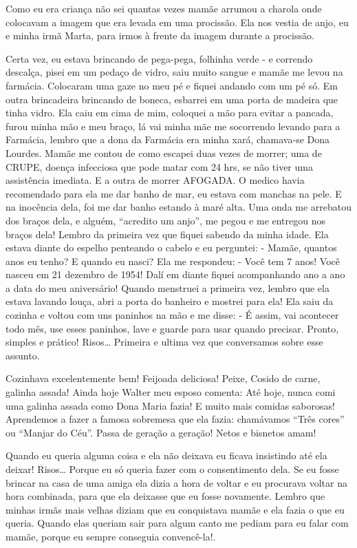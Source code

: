 \documentclass[
  brazil,
  a6paper,
  oneside,
  landscape,
  14pt]{scrbook}
\begin{document}
Como eu era criança não sei quantas vezes mamãe arrumou a charola onde
colocavam a imagem que era levada em uma procissão. Ela nos vestia de
anjo, eu e minha irmã Marta, para irmos à frente da imagem durante a
procissão.

Certa vez, eu estava brincando de pega-pega, folhinha verde - e correndo
descalça, pisei em um pedaço de vidro, saiu muito sangue e mamãe me
levou na farmácia. Colocaram uma gaze no meu pé e fiquei andando com um
pé só. Em outra brincadeira brincando de boneca, esbarrei em uma porta
de madeira que tinha vidro. Ela caiu em cima de mim, coloquei a mão para
evitar a pancada, furou minha mão e meu braço, lá vai minha mãe me
socorrendo levando para a Farmácia, lembro que a dona da Farmácia era
minha xará, chamava-se Dona Lourdes. Mamãe me contou de como escapei
duas vezes de morrer; uma de CRUPE, doença infecciosa que pode matar com
24 hrs, se não tiver uma assistência imediata. E a outra de morrer
AFOGADA. O medico havia recomendado para ela me dar banho de mar, eu
estava com manchas na pele. E na inocência dela, foi me dar banho
estando à maré alta. Uma onda me arrebatou dos braços dela, e alguém,
``acredito um anjo'', me pegou e me entregou nos braços dela! Lembro da
primeira vez que fiquei sabendo da minha idade. Ela estava diante do
espelho penteando o cabelo e eu perguntei: - Mamãe, quantos anos eu
tenho? E quando eu nasci? Ela me respondeu: - Você tem 7 anos! Você
nasceu em 21 dezembro de 1954! Dalí em diante fiquei acompanhando ano a
ano a data do meu aniversário! Quando menstruei a primeira vez, lembro
que ela estava lavando louça, abri a porta do banheiro e mostrei para
ela! Ela saiu da cozinha e voltou com uns paninhos na mão e me disse: -
É assim, vai acontecer todo mês, use esses paninhos, lave e guarde para
usar quando precisar. Pronto, simples e prático! Risos\ldots{} Primeira
e ultima vez que conversamos sobre esse assunto.

Cozinhava excelentemente bem! Feijoada deliciosa! Peixe, Cosido de
carne, galinha assada! Ainda hoje Walter meu esposo comenta: Até hoje,
nunca comi uma galinha assada como Dona Maria fazia! E muito mais
comidas saborosas! Aprendemos a fazer a famosa sobremesa que ela fazia:
chamávamos ``Três cores'' ou ``Manjar do Céu''. Passa de geração a
geração! Netos e bisnetos amam!

Quando eu queria alguma coisa e ela não deixava eu ficava insistindo até
ela deixar! Risos\ldots{} Porque eu só queria fazer com o consentimento
dela. Se eu fosse brincar na casa de uma amiga ela dizia a hora de
voltar e eu procurava voltar na hora combinada, para que ela deixasse
que eu fosse novamente. Lembro que minhas irmãs mais velhas diziam que
eu conquistava mamãe e ela fazia o que eu queria. Quando elas queriam
sair para algum canto me pediam para eu falar com mamãe, porque eu
sempre conseguia convencê-la!.
\end{document}
